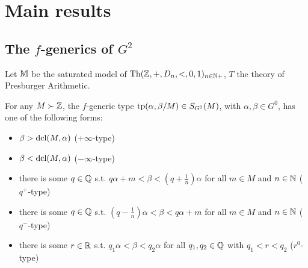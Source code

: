 \documentclass[11pt]{article}
\begin{document}
\section{Main results}
\label{sec:orge23d08b}
\subsection{The \texorpdfstring{\(f\)}{f}-generics of \(G^2\)}
\label{sec:orgec2c047}
Let \(\mathbb{M}\) be the saturated model of \(\operatorname{Th}(\mathbb{Z},+,D_n,<,0,1)_{n\in\mathbb{N}+}\), \(T\) the theory of
Presburger Arithmetic.

\begin{proposition}[]
For any \(M\succ\mathbb{Z}\), the \(f\)-generic type \(\operatorname{tp}(\alpha,\beta/M)\in S_{G^2}(M)\), with \(\alpha,\beta\in G^0\), has one of
the following forms:
\begin{itemize}
\item \(\beta>\operatorname{dcl}(M,\alpha)\) (\(+\infty\)-type)
\item \(\beta<\operatorname{dcl}(M,\alpha)\) (\(-\infty\)-type)
\item there is some \(q\in\mathbb{Q}\) s.t. \(q\alpha+m<\beta<(q+\frac{1}{n})\alpha\) for all \(m\in M\) and \(n\in\mathbb{N}\)
(\(q^+\)-type)
\item there is some \(q\in\mathbb{Q}\) s.t. \((q-\frac{1}{n})\alpha<\beta<q\alpha+m\) for all \(m\in M\) and \(n\in\mathbb{N}\)
(\(q^-\)-type)
\item there is some \(r\in\mathbb{R}\) s.t. \(q_1\alpha<\beta<q_2\alpha\) for all \(q_1,q_2\in\mathbb{Q}\) with \(q_1<r<q_2\) (\(r^0\)-type)
\end{itemize}
\end{proposition}
\end{document}
